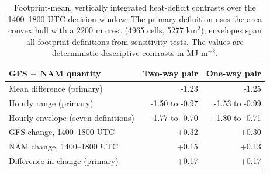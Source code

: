 \documentclass[air,article,submit,moreauthors]{Definitions/mdpi}
\begin{document}
\begin{table}[H]
\caption{Footprint-mean, vertically integrated heat-deficit contrasts over the 1400--1800 UTC decision window.
The primary definition uses the area convex hull with a 2200 m crest (4965 cells, 5277 km$^{2}$); envelopes span all footprint definitions from sensitivity tests.
The values are deterministic descriptive contrasts in MJ m$^{-2}$.}
\label{tab:v3-heatdeficit}
\centering
\begin{tabular}{lrr}
\toprule
GFS $-$ NAM quantity & Two-way pair & One-way pair \\
\midrule
Mean difference (primary) & -1.23 & -1.25 \\
Hourly range (primary) & -1.50 to -0.97 & -1.53 to -0.99 \\
Hourly envelope (seven definitions) & -1.77 to -0.70 & -1.80 to -0.71 \\
GFS change, 1400--1800 UTC & +0.32 & +0.30 \\
NAM change, 1400--1800 UTC & +0.15 & +0.13 \\
Difference in change (primary) & +0.17 & +0.17 \\
\bottomrule
\end{tabular}
\end{table}

\begin{table}[H]
\caption{Case-window temperature stations and nearest d02 sampling audit.
Coordinates and reported elevations are from the registered Synoptic Data PBC metadata; separation is great-circle distance to the sampled cell centre, and the final column is X3 default-terrain model height minus reported station elevation.}
\label{tab:v3-stations}
\centering
\scriptsize
{}
\end{table}
\end{document}
